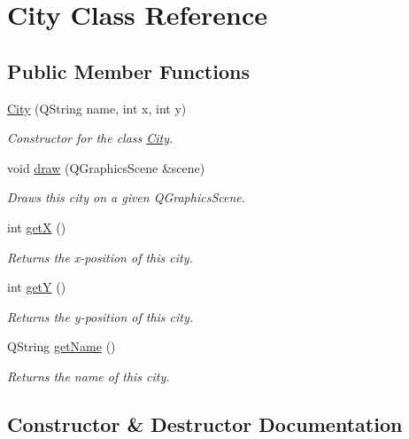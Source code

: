 \hypertarget{class_city}{}\section{City Class Reference}
\label{class_city}
\subsection*{Public Member Functions}
\begin{DoxyCompactItemize}
\item 
\hyperlink{class_city_a9e29f32d33f56bdf59cba425a7e08bd8}{City} (Q\+String name, int x, int y)
\begin{DoxyCompactList}\small\item\em Constructor for the class \hyperlink{class_city}{City}. \end{DoxyCompactList}\item 
void \hyperlink{class_city_a3d22cac343c40bf53d6bc8d831ac4262}{draw} (Q\+Graphics\+Scene \&scene)
\begin{DoxyCompactList}\small\item\em Draws this city on a given Q\+Graphics\+Scene. \end{DoxyCompactList}\item 
int \hyperlink{class_city_a31a58c2f36a488519ce6bb8373e6a329}{getX} ()
\begin{DoxyCompactList}\small\item\em Returns the x-\/position of this city. \end{DoxyCompactList}\item 
int \hyperlink{class_city_ada68b2e07e01a526b68011c3a638ee96}{getY} ()
\begin{DoxyCompactList}\small\item\em Returns the y-\/position of this city. \end{DoxyCompactList}\item 
Q\+String \hyperlink{class_city_afe733410d61155d8a4013293b0b72408}{get\+Name} ()
\begin{DoxyCompactList}\small\item\em Returns the name of this city. \end{DoxyCompactList}\end{DoxyCompactItemize}


\subsection{Constructor \& Destructor Documentation}
\mbox{\label{class_city_a9e29f32d33f56bdf59cba425a7e08bd8}} 

